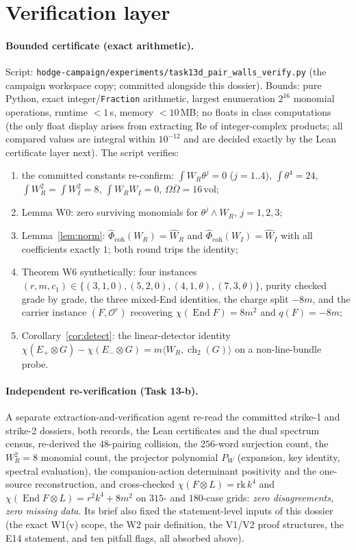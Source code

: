 \documentclass[11pt]{article}
\theoremstyle{definition}
\newcommand{\ch}{\operatorname{ch}}
\newcommand{\End}{\operatorname{End}}
\newcommand{\vol}{\mathrm{vol}}
\newcommand{\FMc}{\widehat\Phi}
\begin{document}
\section{Verification layer}\label{sec:cert}

\paragraph{Bounded certificate (exact arithmetic).}
Script: \texttt{hodge-campaign/experiments/task13d\_pair\_walls\_verify.py}
(the campaign workspace copy; committed alongside this dossier).
Bounds: pure Python, exact integer/\texttt{Fraction} arithmetic, largest
enumeration $2^{16}$ monomial operations, runtime $<1$\,s, memory
$<10$\,MB; no floats in class computations (the only float display arises
from extracting $\mathrm{Re}$ of integer-complex products; all compared
values are integral within $10^{-12}$ and are decided exactly by the Lean
certificate layer next).
The script verifies:
\begin{enumerate}
\item the committed constants re-confirm: $\int W_R\theta^j=0$ ($j=1..4$),
$\int\theta^4=24$, $\int W_R^2=\int W_I^2=8$, $\int W_RW_I=0$,
$\Omega\overline\Omega=16\,\vol$;
\item Lemma W0: zero surviving monomials for $\theta^j\wedge W_R$,
$j=1,2,3$;
\item Lemma~\ref{lem:norm}: $\FMc_{\mathrm{coh}}(W_R)=\widehat W_R$ and
$\FMc_{\mathrm{coh}}(W_I)=\widehat W_I$ with all coefficients exactly $1$;
both round trips the identity;
\item Theorem W6 synthetically: four instances
$(r,m,c_1)\in\{(3,1,0),(5,2,0),(4,1,\theta),(7,3,\theta)\}$, purity checked
grade by grade, the three mixed-End identities, the charge split $-8m$,
and the carrier instance $(F,\mathcal O^r)$ recovering $\chi(\End F)=8m^2$
and $q(F)=-8m$;
\item Corollary~\ref{cor:detect}: the linear-detector identity
$\chi(E_+\otimes G)-\chi(E_-\otimes G)=m\langle W_R,\ch_2(G)\rangle$ on a
non-line-bundle probe.
\end{enumerate}

\paragraph{Independent re-verification (Task 13-b).}
A separate extraction-and-verification agent re-read the committed strike-1
and strike-2 dossiers, both records, the Lean certificates and the dual
spectrum census, re-derived the $48$-pairing collision, the $256$-word
surjection count, the $W_R^2=8$ monomial count, the projector polynomial
$P_W$ (expansion, key identity, spectral evaluation), the companion-action
determinant positivity and the one-source reconstruction, and cross-checked
$\chi(F\otimes L)=\mathrm{rk}\,k^4$ and
$\chi(\End F\otimes L)=r^2k^4+8m^2$ on $315$- and $180$-case grids:
\emph{zero disagreements, zero missing data}. Its brief also fixed the
statement-level inputs of this dossier (the exact W1(v) scope, the W2 pair
definition, the V1/V2 proof structures, the E14 statement, and ten
pitfall flags, all absorbed above).
\end{document}
